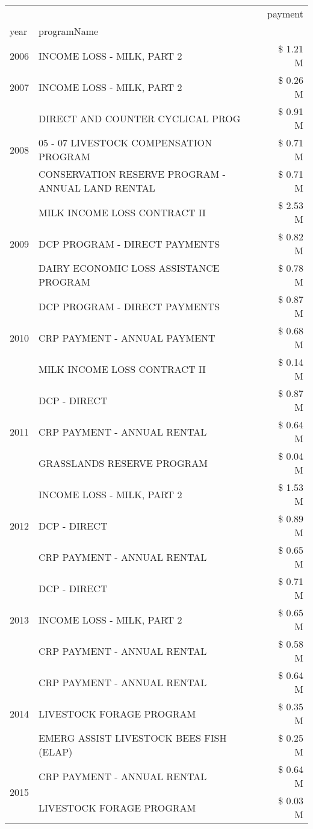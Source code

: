 \begin{tabular}{llr}
\toprule
 &  & payment \\
year & programName &  \\
\midrule
2006 & INCOME LOSS - MILK, PART 2 & \$ 1.21 M \\
\cline{1-3}
2007 & INCOME LOSS - MILK, PART 2 & \$ 0.26 M \\
\cline{1-3}
\multirow[t]{3}{*}{2008} & DIRECT AND COUNTER CYCLICAL PROG & \$ 0.91 M \\
 & 05 - 07 LIVESTOCK COMPENSATION PROGRAM & \$ 0.71 M \\
 & CONSERVATION RESERVE PROGRAM - ANNUAL LAND RENTAL & \$ 0.71 M \\
\cline{1-3}
\multirow[t]{3}{*}{2009} & MILK INCOME LOSS CONTRACT II & \$ 2.53 M \\
 & DCP PROGRAM - DIRECT PAYMENTS & \$ 0.82 M \\
 & DAIRY ECONOMIC LOSS ASSISTANCE PROGRAM & \$ 0.78 M \\
\cline{1-3}
\multirow[t]{3}{*}{2010} & DCP PROGRAM - DIRECT PAYMENTS & \$ 0.87 M \\
 & CRP PAYMENT - ANNUAL PAYMENT & \$ 0.68 M \\
 & MILK INCOME LOSS CONTRACT II & \$ 0.14 M \\
\cline{1-3}
\multirow[t]{3}{*}{2011} & DCP - DIRECT & \$ 0.87 M \\
 & CRP PAYMENT - ANNUAL RENTAL & \$ 0.64 M \\
 & GRASSLANDS RESERVE PROGRAM & \$ 0.04 M \\
\cline{1-3}
\multirow[t]{3}{*}{2012} & INCOME LOSS - MILK, PART 2 & \$ 1.53 M \\
 & DCP - DIRECT & \$ 0.89 M \\
 & CRP PAYMENT - ANNUAL RENTAL & \$ 0.65 M \\
\cline{1-3}
\multirow[t]{3}{*}{2013} & DCP - DIRECT & \$ 0.71 M \\
 & INCOME LOSS - MILK, PART 2 & \$ 0.65 M \\
 & CRP PAYMENT - ANNUAL RENTAL & \$ 0.58 M \\
\cline{1-3}
\multirow[t]{3}{*}{2014} & CRP PAYMENT - ANNUAL RENTAL & \$ 0.64 M \\
 & LIVESTOCK FORAGE PROGRAM & \$ 0.35 M \\
 & EMERG ASSIST LIVESTOCK BEES FISH (ELAP) & \$ 0.25 M \\
\cline{1-3}
\multirow[t]{3}{*}{2015} & CRP PAYMENT - ANNUAL RENTAL & \$ 0.64 M \\
 & LIVESTOCK FORAGE PROGRAM & \$ 0.03 M \\

\end{tabular}

